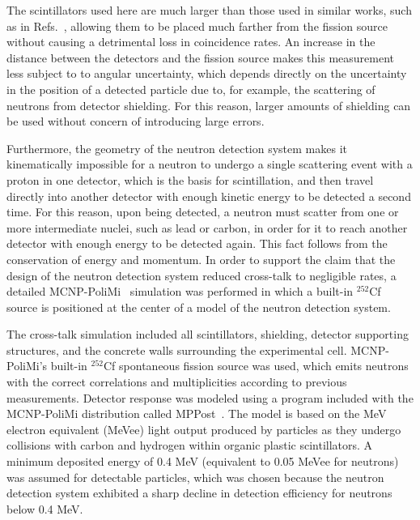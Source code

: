 The scintillators used here are much larger than those used in similar works, such as in Refs.~\cite{Pozzi2016,Verbeke2018}, allowing them to be placed much farther from the fission source without causing a detrimental loss in coincidence rates. 
An increase in the distance between the detectors and the fission source makes this measurement less subject to to angular uncertainty, which depends directly on the uncertainty in the position of a detected particle due to, for example, the scattering of neutrons from detector shielding.
For this reason, larger amounts of shielding can be used without concern of introducing large errors.
 
Furthermore, the geometry of the neutron detection system makes it kinematically impossible for a neutron to undergo a single scattering event with a proton in one detector, which is the basis for scintillation, and then travel directly into another detector with enough kinetic energy to be detected a second time.
For this reason, upon being detected, a neutron must scatter from one or more intermediate nuclei, such as lead or carbon, in order for it to reach another detector with enough energy to be detected again.
This fact follows from the conservation of energy and momentum.
In order to support the claim that the design of the neutron detection system reduced cross-talk to negligible rates, a detailed MCNP-PoliMi~\cite{MCNP_POLIMI} simulation was performed in which a built-in $^{252}$Cf source is positioned at the center of a model of the neutron detection system.

The cross-talk simulation included all scintillators, shielding, detector supporting structures, and the concrete walls surrounding the experimental cell.
MCNP-PoliMi's built-in $^{252}$Cf spontaneous fission source was used, which emits neutrons with the correct correlations and multiplicities according to previous measurements.
Detector response was modeled using a program included with the MCNP-PoliMi distribution called MPPost~\cite{MPPost}.
The model is based on the MeV electron equivalent (MeVee) light output produced by particles as they undergo collisions with carbon and hydrogen within organic plastic scintillators.
A minimum deposited energy of 0.4 MeV (equivalent to 0.05 MeVee for neutrons) was assumed for detectable particles, which was chosen because the neutron detection system exhibited a sharp decline in detection efficiency for neutrons below 0.4 MeV.

